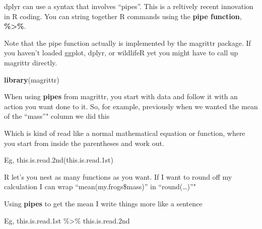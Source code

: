 \documentclass[]{book}
\newenvironment{Shaded}{\begin{snugshade}}{\end{snugshade}}
\newcommand{\KeywordTok}[1]{\textcolor[rgb]{0.13,0.29,0.53}{\textbf{#1}}}
\newcommand{\StringTok}[1]{\textcolor[rgb]{0.31,0.60,0.02}{#1}}
\newcommand{\CommentTok}[1]{\textcolor[rgb]{0.56,0.35,0.01}{\textit{#1}}}
\newcommand{\OperatorTok}[1]{\textcolor[rgb]{0.81,0.36,0.00}{\textbf{#1}}}
\newcommand{\NormalTok}[1]{#1}
\theoremstyle{definition}
\theoremstyle{definition}
\theoremstyle{definition}
\theoremstyle{remark}
\begin{document}
dplyr can use a syntax that involves ``pipes''. This is a reltively
recent innovation in R coding. You can string together R commands using
the \textbf{pipe function}, \textbf{\%\textgreater{}\%}.

Note that the pipe function actually is implemented by the magrittr
package. If you haven't loaded ggplot, dplyr, or wildlifeR yet you might
have to call up magrittr directly.

\begin{Shaded}
\begin{Highlighting}[]
\KeywordTok{library}\NormalTok{(magrittr)}
\end{Highlighting}
\end{Shaded}

When using \textbf{pipes} from magrittr, you start with data and follow
it with an action you want done to it. So, for example, previously when
we wanted the mean of the ``mass''" column we did this

\begin{Shaded}
\end{Shaded}

Which is kind of read like a normal mathematical equation or function,
where you start from inside the parentheses and work out.

Eg, this.is.read.2nd(this.is.read.1st)

R let's you nest as many functions as you want. If I want to round off
my calculation I can wrap ``mean(my.frogs\$mass)'' in
``round(\ldots{})''"

\begin{Shaded}
\end{Shaded}

Using \textbf{pipes} to get the mean I write things more like a sentence

Eg, this.is.read.1st \%\textgreater{}\% this.is.read.2nd

\begin{Shaded}
\end{Shaded}
\end{document}
